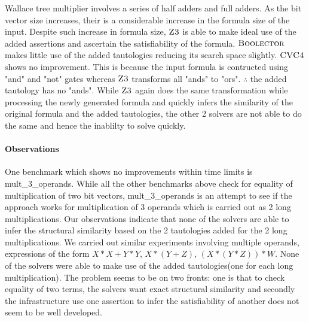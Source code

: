 Wallace tree multiplier involves a series of half adders and full adders. As the bit vector size increases, their is a considerable increase in the formula size of the input. Despite such increase in formula size, $\textsc{Z3}$ is able to make ideal use of the added assertions and ascertain the satisfiability of the formula. $\textsc{Boolector}$ makes little use of the added tautologies reducing its search space slightly. $\textsc{CVC4}$ shows no improvement. This is because the input formula is contructed using "and" and "not" gates whereas $\textsc{Z3}$ transforms all "ands" to "ors". $\therefore$ the added tautology has no "ands". While $\textsc{Z3}$ again does the same transformation while processing the newly generated formula and quickly infers the similarity of the original formula and the added tautologies, the other 2 solvers are not able to do the same and hence the inablilty to solve quickly.

\paragraph{\bf Observations}
%
One benchmark which shows no improvements within time limits is mult\_3\_operands. While all the other benchmarks above check for equality of multiplication of two bit vectors, mult\_3\_operands is an attempt to see if the approach works for multiplication of 3 operands which is carried out as 2 long multiplications. Our observations indicate that none of the solvers are able to infer the structural similarity based on the 2 tautologies added for the 2 long multiplications. We carried out similar experiments involving multiple operands, expressions of the form $X*X + Y*Y$, $X*(Y+Z)$, $(X*(Y*Z))*W$. None of the solvers were able to make use of the added tautologies(one for each long multiplication). The problem seems to be on two fronts: one is that to check equality of two terms, the solvers want exact structural similarity and secondly the infrastructure use one assertion to infer the satisfiability of another does not seem to be well developed. 




